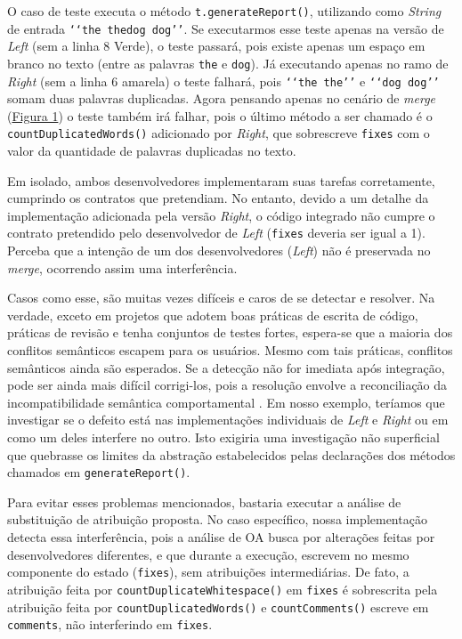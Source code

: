 O caso de teste executa o método \texttt{t.generateReport()}, utilizando como \emph{String} de entrada \texttt{‘‘the the\quad dog dog’’}. Se executarmos esse teste apenas na versão de \emph{Left} (sem a linha 8 Verde), o teste passará, pois existe apenas um espaço em branco no texto (entre as palavras \texttt{the} e \texttt{dog}). Já executando apenas no ramo de \emph{Right} (sem a linha 6 amarela) o teste falhará, pois \texttt{‘‘the the’’} e \texttt{‘‘dog dog’’} somam duas palavras duplicadas. Agora pensando apenas no cenário de \emph{merge} (\hyperref[fig:codigo-motivador]{Figura 1}) o teste também irá falhar, pois o último método a ser chamado é o \texttt{countDuplicatedWords()} adicionado por \emph{Right}, que sobrescreve \texttt{fixes} com o valor da quantidade de palavras duplicadas no texto.

Em isolado, ambos desenvolvedores implementaram suas tarefas corretamente, cumprindo os contratos que pretendiam. No entanto, devido a um detalhe da implementação adicionada pela versão \emph{Right}, o código integrado não cumpre o contrato pretendido pelo desenvolvedor de \emph{Left} (\texttt{fixes} deveria ser igual a 1). Perceba que a intenção de um dos desenvolvedores (\emph{Left}) não é preservada no \emph{merge}, ocorrendo assim uma interferência. 

Casos como esse, são muitas vezes difíceis e caros de se detectar e resolver. Na verdade, exceto em projetos que adotem boas práticas de escrita de código, práticas de revisão e tenha conjuntos de testes fortes, espera-se que a maioria dos conflitos semânticos escapem para os usuários. Mesmo com tais práticas, conflitos semânticos ainda são esperados. Se a detecção não for imediata após integração, pode ser ainda mais difícil corrigi-los, pois a resolução envolve a reconciliação da incompatibilidade semântica comportamental \cite{LeusonSilva2020}. Em nosso exemplo, teríamos que investigar se o defeito está nas implementações individuais de \emph{Left} e \emph{Right} ou em como um deles interfere no outro. Isto exigiria uma investigação não superficial que quebrasse os limites da abstração estabelecidos pelas declarações dos métodos chamados em \texttt{generateReport()}.

Para evitar esses problemas mencionados, bastaria executar a análise de substituição de atribuição proposta. No caso específico, nossa implementação detecta essa interferência, pois a análise de OA busca por alterações feitas por desenvolvedores diferentes, e que durante a execução, escrevem no mesmo componente do estado (\texttt{fixes}), sem atribuições intermediárias. De fato, a atribuição feita por \texttt{countDuplicateWhitespace()} em \texttt{fixes} é sobrescrita pela atribuição feita por \texttt{countDuplicatedWords()} e \texttt{countComments()} escreve em \texttt{comments}, não interferindo em \texttt{fixes}. 



